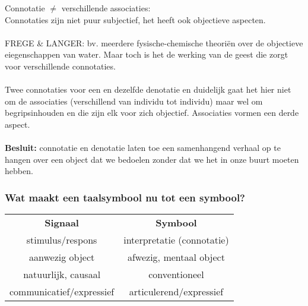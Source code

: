 \documentclass[11pt,a4paper]{article}
\begin{document}
\begin{enumerate}
\begin{center}
\end{center}
Connotatie $\neq$ verschillende associaties:\\
Connotaties zijn niet puur subjectief, het heeft ook objectieve aspecten.
\\
\\
FREGE \& LANGER: bv. meerdere fysische-chemische theori\"en over de objectieve eiegenschappen van water. Maar toch is het de werking van de geest die zorgt voor verschillende connotaties.
\\
\\
Twee connotaties voor een en dezelfde denotatie en duidelijk gaat het hier niet om de associaties (verschillend van individu tot individu) maar wel om begripsinhouden en die zijn elk voor zich objectief.
Associaties vormen een derde aspect.
\\
\\
\textbf{Besluit:} connotatie en denotatie laten toe een samenhangend verhaal op te hangen over een object dat we bedoelen zonder dat we het in onze buurt moeten hebben.

\subsubsection*{Wat maakt een taalsymbool nu tot een symbool?}
\begin{center}
\begin{tabular}{c c}
\textbf{Signaal} & \textbf{Symbool}\\
stimulus/respons & interpretatie (connotatie)\\
aanwezig object & afwezig, mentaal object\\
natuurlijk, causaal & conventioneel\\
communicatief/expressief & articulerend/expressief\\
\end{tabular}
\end{center}
\end{enumerate}
\end{document}
